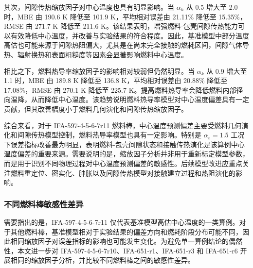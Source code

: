 其次，间隙传热缩放因子对中心温度也具有明显影响。当 \(\alpha_h\) 从 0.5 增大至 2.0 时，MBE 由 190.6 K 降低至 101.9 K，平均相对误差由 21.11\% 降低至 15.35\%，RMSE 由 271.7 K 降低至 211.6 K。该结果表明，增强燃料-包壳间隙传热能力可以有效降低中心温度，并改善与实验结果的符合程度。因此，基准模型中部分温度高估也可能来源于间隙热阻偏大，尤其是在尚未完全接触的燃耗区间，间隙气体导热、辐射换热和表面粗糙度等因素会显著影响燃料中心温度。

相比之下，燃料热导率缩放因子的影响相对较弱但仍然明显。当 \(\alpha_k\) 从 0.9 增大至 1.1 时，MBE 由 189.8 K 降低至 136.8 K，平均相对误差由 20.88\% 降低至 17.08\%，RMSE 由 270.1 K 降低至 225.7 K。提高燃料热导率会降低燃料内部径向温降，从而降低中心温度。该趋势说明燃料热导率模型对中心温度偏差具有一定贡献，但其改善幅度小于燃料几何演化和间隙传热缩放因子。

综合来看，对于 IFA-597-4-5-6-7r11 燃料棒，中心温度预测偏差主要受燃料几何演化和间隙传热模型控制，燃料热导率模型也具有一定影响。特别是 \(\alpha_{\varepsilon}=1.5\) 工况下误差指标改善最为明显，表明燃料-包壳间隙状态和接触传热演化是该算例中心温度偏差的重要来源。需要说明的是，缩放因子分析并非用于重新标定模型参数，而是用于识别不同物理过程对中心温度预测偏差的敏感性。后续模型改进应重点关注燃料重定位、密实化、肿胀以及间隙传热模型对接触建立过程和热阻演化的影响。

\subsubsection{不同燃料棒敏感性差异}
需要指出的是，IFA-597-4-5-6-7r11 仅代表基准模型高估中心温度的一类算例。对于其他燃料棒，基准模型相对于实验结果的偏差方向和燃耗阶段分布可能不同，因此相同缩放因子对误差指标的影响也可能发生变化。为避免单一算例结论的偶然性，本文进一步对 IFA-597-4-5-6-7r10、IFA-651-r1、IFA-651-r3 和 IFA-651-r6 开展相同的缩放因子分析，并比较不同燃料棒之间的敏感性差异。

